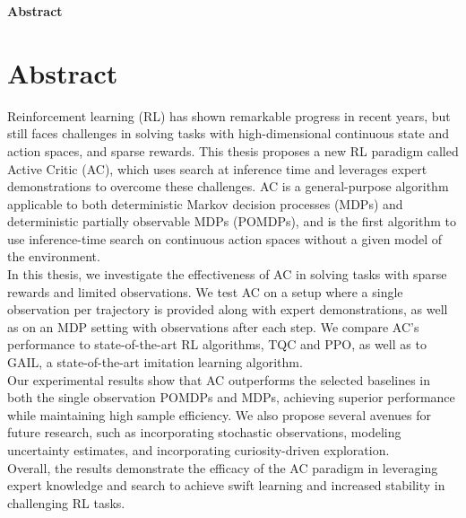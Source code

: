 \clearemptydoublepage
{}
{}

\vspace*{2cm}
\begin{center}
{\Large \textbf{Abstract}}
\end{center}
\vspace{1cm}

\chapter*{Abstract}
\label{chapter:Abstract}

Reinforcement learning (RL) has shown remarkable progress in recent years, but still faces challenges in solving tasks with high-dimensional 
continuous state and action spaces, and sparse rewards. This thesis proposes a new RL paradigm called Active Critic (AC), which uses search at 
inference time and leverages expert demonstrations to overcome these challenges. AC is a general-purpose algorithm applicable to both deterministic 
Markov decision processes (MDPs) and deterministic partially observable MDPs (POMDPs), and is the first algorithm to use inference-time search on continuous 
action spaces without a given model of the environment.\\

In this thesis, we investigate the effectiveness of AC in solving tasks with sparse rewards and limited observations. We test AC on 
a setup where a single observation per trajectory is provided along with expert demonstrations, as well as on an MDP setting with observations 
after each step. We compare AC's performance to state-of-the-art RL algorithms, TQC and PPO, as well as to GAIL, a state-of-the-art imitation 
learning algorithm. \\

Our experimental results show that AC outperforms the selected baselines in both the single observation POMDPs and MDPs, achieving superior 
performance while maintaining high sample efficiency. We also propose several avenues for future research, such as incorporating stochastic 
observations, modeling uncertainty estimates, and incorporating curiosity-driven exploration.\\

Overall, the results demonstrate the efficacy of the AC paradigm in leveraging expert knowledge and search to achieve swift learning and 
increased stability in challenging RL tasks.